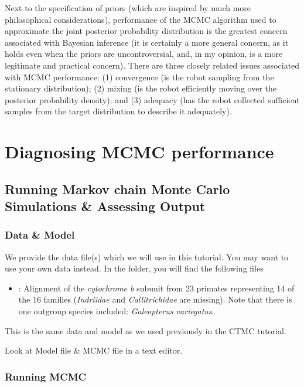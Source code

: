 Next to the specification of priors (which are inspired by much more philosophical considerations), performance of the MCMC algorithm used to approximate the joint posterior probability distribution is the greatest concern associated with Bayesian inference (it is certainly a more general concern, as it holds even when the priors are uncontroversial, and, in my opinion, is a more legitimate and practical concern). 
There are three closely related issues associated with MCMC performance: (1) convergence (is the robot sampling from the stationary distribution); (2) mixing (is the robot efficiently moving over the posterior probability density); and (3) adequacy (has the robot collected sufficient samples from the target distribution to describe it adequately).


\bigskip
\section{Diagnosing MCMC performance}

\subsection{Running Markov chain Monte Carlo Simulations \& Assessing Output}\label{secUnif} 


\subsubsection{Data \& Model}

We provide the data file(s) which we will use in this tutorial.
You may want to use your own data instead.
In the  folder, you will find the following files
\begin{itemize}
\item
{}: Alignment of the \textit{cytochrome b} subunit from 23 primates representing 14 of the 16 families (\textit{Indriidae} and \textit{Callitrichidae} are missing). Note that there is one outgroup species included: \emph{Galeopterus variegatus}.
\end{itemize}
This is the same data and model as we used previously in the CTMC tutorial.

Look at Model file \& MCMC file in a text editor.


\subsubsection{Running MCMC}

